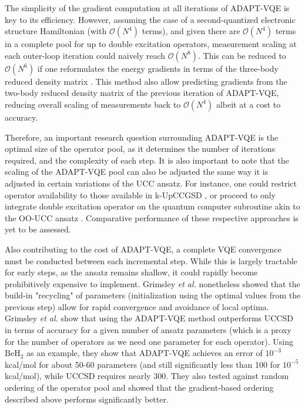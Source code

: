 The simplicity of the gradient computation at all iterations of ADAPT-VQE is key to its efficiency. However, assuming the case of a second-quantized electronic structure Hamiltonian (with $\mathcal{O}(N^4)$ terms), and given there are $\mathcal{O}(N^4)$ terms in a complete pool for up to double excitation operators, measurement scaling at each outer-loop iteration could naively reach $\mathcal{O}(N^8)$. This can be reduced to $\mathcal{O}(N^6)$ if one reformulates the energy gradients in terms of the three-body reduced density matrix \cite{Liu2021_adapt}. This method also allow predicting gradients from the two-body reduced density matrix of the previous iteration of ADAPT-VQE, reducing overall scaling of measurements back to $\mathcal{O}(N^4)$ albeit at a cost to accuracy.

Therefore, an important research question surrounding ADAPT-VQE is the optimal size of the operator pool, as it determines the number of iterations required, and the complexity of each step.
It is also important to note that the scaling of the ADAPT-VQE pool can also be adjusted the same way it is adjusted in certain variations of the UCC ansatz. For instance, one could restrict operator availability to those available in k-UpCCGSD \cite{Lee2019}, or proceed to only integrate double excitation operator on the quantum computer subroutine akin to the OO-UCC ansatz \cite{Kottmann2021_1}. Comparative performance of these respective approaches is yet to be assessed. 

Also contributing to the cost of ADAPT-VQE, a complete VQE convergence must be conducted between each incremental step. While this is largely tractable for early steps, as the ansatz remains shallow, it could rapidly become prohibitively expensive to implement. Grimsley {\it et al.} \cite{Grimsley2022} nonetheless showed that the build-in "recycling" of parameters (initialization using the optimal values from the previous step) allow for rapid convergence and avoidance of local optima. 
Grimsley \textit{et al.} \cite{Grimsley2019} show that using the ADAPT-VQE method outperforms UCCSD in terms of accuracy for a given number of ansatz parameters (which is a proxy for the number of operators as we need one parameter for each operator). Using $\mathrm{BeH_2}$ as an example, they show that ADAPT-VQE achieves an error of $10^{-3}$ kcal/mol for about 50-60 parameters (and still significantly less than 100 for $10^{-5}$ kcal/mol), while UCCSD requires nearly 300. They also tested against random ordering of the operator pool and showed that the gradient-based ordering described above performs significantly better.

